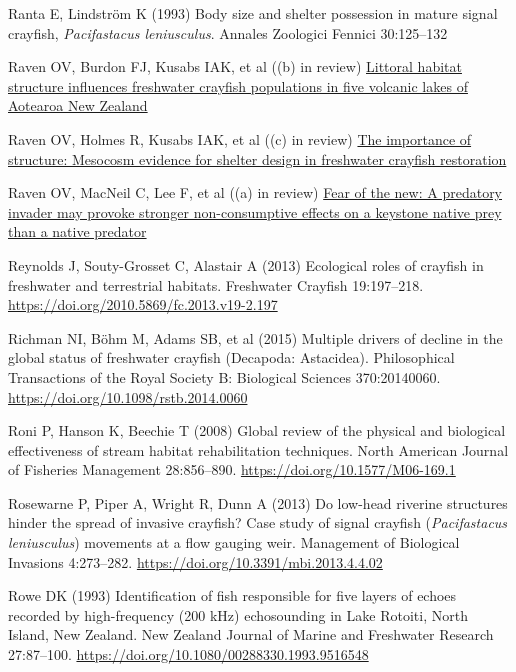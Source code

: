 \documentclass[
  12pt,
  a4paper,
  oneside]{scrbook}
\newlength{\cslhangindent}
\newenvironment{CSLReferences}[2] %
 {\begin{list}{}{%
  \setlength{\itemindent}{0pt}
  \setlength{\leftmargin}{0pt}
  \setlength{\parsep}{0pt}
  \ifodd #1
   \setlength{\leftmargin}{\cslhangindent}
   \setlength{\itemindent}{-1\cslhangindent}
  \fi
  \setlength{\itemsep}{#2\baselineskip}}}
 {\end{list}}
\begin{document}
\begin{CSLReferences}{1}{1}
Ranta E, Lindström K (1993) Body size and shelter possession in mature
signal crayfish, {\emph{Pacifastacus leniusculus}}. Annales Zoologici
Fennici 30:125--132

Raven OV, Burdon FJ, Kusabs IAK, et al ((b) in review)
\href{https://olivierraven.github.io/Koura_shoreline_habitats/}{Littoral
habitat structure influences freshwater crayfish populations in five
volcanic lakes of {Aotearoa New Zealand}}

Raven OV, Holmes R, Kusabs IAK, et al ((c) in review)
\href{https://olivierraven.github.io/Koura_Mesocosm/}{The importance of
structure: Mesocosm evidence for shelter design in freshwater crayfish
restoration}

Raven OV, MacNeil C, Lee F, et al ((a) in review)
\href{https://olivierraven.github.io/NCE_Koura_catfish/}{Fear of the
new: A predatory invader may provoke stronger non-consumptive effects on
a keystone native prey than a native predator}

Reynolds J, Souty-Grosset C, Alastair A (2013) Ecological roles of
crayfish in freshwater and terrestrial habitats. Freshwater Crayfish
19:197--218. \url{https://doi.org/2010.5869/fc.2013.v19-2.197}

Richman NI, Böhm M, Adams SB, et al (2015) Multiple drivers of decline
in the global status of freshwater crayfish ({Decapoda}: {Astacidea}).
Philosophical Transactions of the Royal Society B: Biological Sciences
370:20140060. \url{https://doi.org/10.1098/rstb.2014.0060}

Roni P, Hanson K, Beechie T (2008) Global review of the physical and
biological effectiveness of stream habitat rehabilitation techniques.
North American Journal of Fisheries Management 28:856--890.
\url{https://doi.org/10.1577/M06-169.1}

Rosewarne P, Piper A, Wright R, Dunn A (2013) Do low-head riverine
structures hinder the spread of invasive crayfish? Case study of signal
crayfish ({\emph{Pacifastacus leniusculus}}) movements at a flow gauging
weir. Management of Biological Invasions 4:273--282.
\url{https://doi.org/10.3391/mbi.2013.4.4.02}

Rowe DK (1993) Identification of fish responsible for five layers of
echoes recorded by high-frequency (200 kHz) echosounding in {Lake
Rotoiti}, {North Island, New Zealand}. New Zealand Journal of Marine and
Freshwater Research 27:87--100.
\url{https://doi.org/10.1080/00288330.1993.9516548}


\end{CSLReferences}
\end{document}
